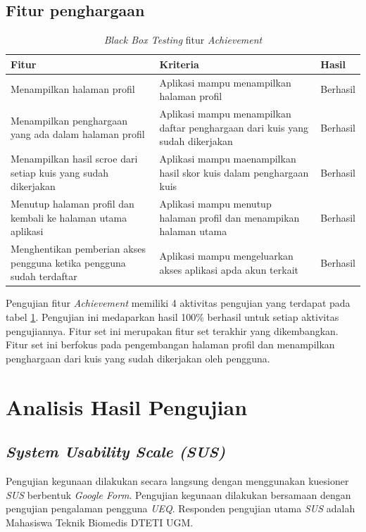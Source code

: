 \subsection{Fitur penghargaan}
\begin{table}[H]
	\caption{\textit{Black Box Testing} fitur \textit{Achievement}}
	\label{Tab:blackBoxAchie}
	\begin{tabular}{|p{}|p{}|p{}|}
		\hline
		 \centering\textbf{Fitur} & \multicolumn{1}{m{0.45\textwidth}|}{\centering \textbf{Kriteria}}&  \multicolumn{1}{m{0.1\textwidth}|}{\centering \textbf{Hasil}}\\
		\hline
		Menampilkan halaman profil
		& Aplikasi mampu menampilkan halaman profil 
		& Berhasil\\
		\hline
		Menampilkan penghargaan yang ada dalam halaman profil
		& Aplikasi mampu menampilkan daftar penghargaan dari kuis yang sudah dikerjakan
		& Berhasil\\
		\hline
		Menampilkan hasil scroe dari setiap kuis yang sudah dikerjakan
		& Aplikasi mampu maenampilkan hasil skor kuis dalam penghargaan kuis
		& Berhasil\\
		\hline
		Menutup halaman profil dan kembali ke halaman utama aplikasi
		&Aplikasi mampu menutup halaman profil dan menampikan halaman utama
		& Berhasil\\
		\hline
		Menghentikan pemberian akses pengguna ketika pengguna sudah terdaftar
		& Aplikasi mampu mengeluarkan akses aplikasi apda akun terkait
		& Berhasil\\
		\hline
	\end{tabular}
\end{table}
Pengujian fitur \textit{Achievement} memiliki 4 aktivitas pengujian yang terdapat pada tabel \ref*{Tab:blackBoxAchie}.
Pengujian ini medaparkan hasil 100\% berhasil untuk setiap aktivitas pengujiannya. Fitur set ini merupakan fitur set terakhir yang dikembangkan.
Fitur set ini berfokus pada pengembangan halaman profil dan menampilkan penghargaan dari kuis yang sudah dikerjakan oleh pengguna.
\newpage
\section{Analisis Hasil Pengujian}
\subsection{\textit{System Usability Scale (SUS)}}
Pengujian kegunaan dilakukan secara langsung dengan menggunakan kuesioner \textit{SUS} berbentuk \textit{Google Form}.
Pengujian kegunaan dilakukan bersamaan dengan pengujian pengalaman pengguna \textit{UEQ}.
Responden pengujian utama \textit{SUS} adalah Mahasiswa Teknik Biomedis DTETI UGM. 

